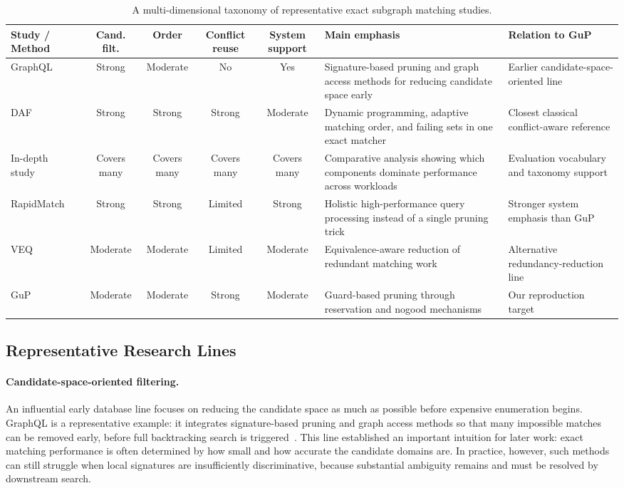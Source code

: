 \begin{table}[t]
  \caption{A multi-dimensional taxonomy of representative exact subgraph matching studies.}
  \label{tab:taxonomy}
  \centering
  \scriptsize
  \setlength{\tabcolsep}{2.5pt}
  \renewcommand{\arraystretch}{1.05}
  \begin{tabular}{p{}ccccp{}p{}}
    \toprule
    Study / Method & Cand. filt. & Order & Conflict reuse & System support & Main emphasis & Relation to GuP \\
    \midrule
    GraphQL~\cite{he2008graphql} & Strong & Moderate & No & Yes & Signature-based pruning and graph access methods for reducing candidate space early & Earlier candidate-space-oriented line \\
    DAF~\cite{han2019daf} & Strong & Strong & Strong & Moderate & Dynamic programming, adaptive matching order, and failing sets in one exact matcher & Closest classical conflict-aware reference \\
    In-depth study~\cite{sun2020study} & Covers many & Covers many & Covers many & Covers many & Comparative analysis showing which components dominate performance across workloads & Evaluation vocabulary and taxonomy support \\
    RapidMatch~\cite{sun2021rapidmatch} & Strong & Strong & Limited & Strong & Holistic high-performance query processing instead of a single pruning trick & Stronger system emphasis than GuP \\
    VEQ~\cite{kim2022veq} & Moderate & Moderate & Limited & Moderate & Equivalence-aware reduction of redundant matching work & Alternative redundancy-reduction line \\
    GuP~\cite{arai2023gup} & Moderate & Moderate & Strong & Moderate & Guard-based pruning through reservation and nogood mechanisms & Our reproduction target \\
    \bottomrule
  \end{tabular}
\end{table}

\subsection{Representative Research Lines}

\paragraph{Candidate-space-oriented filtering.}
An influential early database line focuses on reducing the candidate space as much as possible before expensive enumeration begins. GraphQL is a representative example: it integrates signature-based pruning and graph access methods so that many impossible matches can be removed early, before full backtracking search is triggered~\cite{he2008graphql}. This line established an important intuition for later work: exact matching performance is often determined by how small and how accurate the candidate domains are. In practice, however, such methods can still struggle when local signatures are insufficiently discriminative, because substantial ambiguity remains and must be resolved by downstream search.

